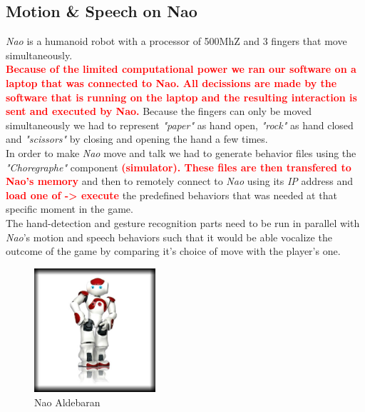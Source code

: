 \documentclass[a4paper, 11pt, twocolumn]{article}
\newcommand{\todo}[1]{\textcolor{red}{\textbf{#1}}}
\begin{document}
        \subsection{Motion \& Speech on Nao}
		\label{sec:Meth_naoPlay}
		\emph{Nao} is a humanoid robot with a processor of 500MhZ and 3 fingers that move simultaneously.\\
         \todo{Because of the limited computational power we ran our software on a laptop that was connected to Nao. All decissions are made by the software that is running on the laptop and the resulting interaction is sent and executed by Nao.}
		\hspace*{10px}Because the fingers can only be moved simultaneously we had to represent \emph{"paper"} as hand open, \emph{"rock"} as hand closed and \emph{"scissors"} by closing and opening the hand a few times.\\
		\hspace*{10px}In order to make \emph{Nao} move and talk we had to generate behavior files using the \emph{"Choregraphe"} component  \todo{(simulator). These files are then transfered to Nao's memory} and then to remotely connect to \emph{Nao} using its \emph{IP} address and  \todo{load one of -> execute } the predefined behaviors that was needed at that specific moment in the game.\\  
        \hspace*{10px}The hand-detection and gesture recognition parts need to be run in parallel with \emph{Nao}\rq s motion and speech behaviors such that it would be able vocalize the outcome of the game by comparing it\rq s choice of move with the player\rq s one.
		\begin{figure}[!hbtp]
		 	\centering
			\includegraphics[width=0.4\textwidth]{Nao.png}
		 	\caption{Nao Aldebaran}
	   	\end{figure}			
\end{document}
